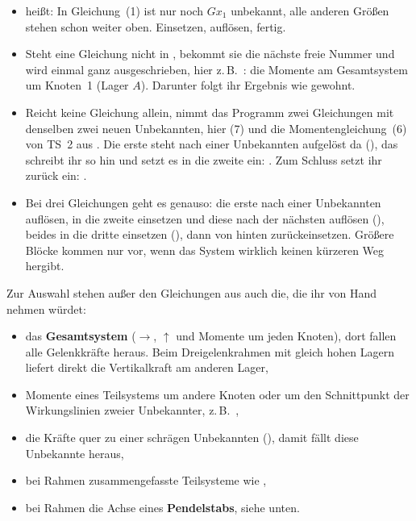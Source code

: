 \begin{itemize}
  \item {} heißt: In Gleichung~(1) ist nur noch $Gx_1$ unbekannt, alle
        anderen Größen stehen schon weiter oben. Einsetzen, auflösen, fertig.
  \item Steht eine Gleichung nicht in , bekommt sie die nächste freie Nummer und wird
        einmal ganz ausgeschrieben, hier z.\,B.\ : die Momente am
        Gesamtsystem um Knoten~1 (Lager $A$). Darunter folgt ihr Ergebnis wie gewohnt.
  \item Reicht keine Gleichung allein, nimmt das Programm zwei Gleichungen mit denselben zwei
        neuen Unbekannten, hier (7) und die Momentengleichung~(6) von TS~2 aus . Die
        erste steht nach einer Unbekannten aufgelöst da (), das
        schreibt ihr so hin und setzt es in die zweite ein: .
        Zum Schluss setzt ihr zurück ein: .
  \item Bei drei Gleichungen geht es genauso: die erste nach einer Unbekannten auflösen, in die
        zweite einsetzen und diese nach der nächsten auflösen (), beides
        in die dritte einsetzen (), dann von hinten zurückeinsetzen.
        Größere Blöcke kommen nur vor, wenn das System wirklich keinen kürzeren Weg hergibt.
\end{itemize}

Zur Auswahl stehen außer den Gleichungen aus  auch die, die ihr von Hand nehmen würdet:

\begin{itemize}
  \item das \textbf{Gesamtsystem} ($\rightarrow$, $\uparrow$ und Momente um jeden Knoten), dort fallen
        alle Gelenkkräfte heraus. Beim Dreigelenkrahmen mit gleich hohen Lagern liefert
         direkt die Vertikalkraft am anderen Lager,
  \item Momente eines Teilsystems um andere Knoten oder um den Schnittpunkt der Wirkungslinien
        zweier Unbekannter, z.\,B.\ ,
  \item die Kräfte quer zu einer schrägen Unbekannten (), damit
        fällt diese Unbekannte heraus,
  \item bei Rahmen zusammengefasste Teilsysteme wie ,
  \item bei Rahmen die Achse eines \textbf{Pendelstabs}, siehe unten.
\end{itemize}

